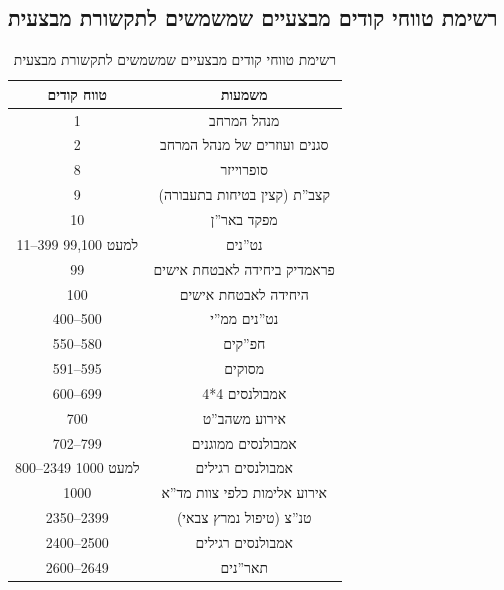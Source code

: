 \documentclass{article}
\begin{document}
\subsection{רשימת טווחי קודים מבצעיים שמשמשים לתקשורת מבצעית}
\begin{table}[H]
    \caption{רשימת טווחי קודים מבצעיים שמשמשים לתקשורת מבצעית}
    \center
    \begin{tabular}{cc}
        \toprule
           טווח קודים & משמעות                                    \\
\midrule
                   1 & מנהל המרחב                                \\
                 2\textendash 7 & סגנים ועוזרים של מנהל המרחב                  \\
                   8 & סופרוייזר                                    \\
                   9 & קצב''ת (קצין בטיחות בתעבורה)                 \\
                  10 & מפקד באר''ן                                 \\
 11–399 למעט 99,100 & נט''נים                                     \\
                  99 & פראמדיק ביחידה לאבטחת אישים                \\
                 100 & היחידה לאבטחת אישים                        \\
             400–500 & נט''נים ממ''י                                 \\
             550–580 & חפ''קים                                     \\
             591–595 & מסוקים                                     \\
             600–699 & אמבולנסים 4*4                              \\
                 700 & אירוע משהב''ט                               \\
             702–799 & אמבולנסים ממוגנים                            \\
 800–2349 למעט 1000 & אמבולנסים רגילים                             \\
                1000 & אירוע אלימות כלפי צוות מד''א                   \\
           2350–2399 & טנ''צ (טיפול נמרץ צבאי)                      \\
           2400–2500 & אמבולנסים רגילים                             \\
           2600–2649 & תאר''נים                                    \\

\end{tabular}
\end{table}
\end{document}
